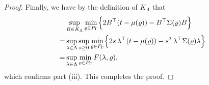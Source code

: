 \documentclass[12pt,leqno,titlepage]{amsart}
\newcommand{\1}{\mathbbm{1}}
\begin{document}
\begin{bibunit}
\begin{proof}
Finally, we have by the definition of $K_\Lambda$ that
\begin{align*}
&\sup_{B\in K_\Lambda}
\min_{\varrho\in P_\Gamma}
\Bigl\{
2B^\top(t-\mu(\varrho))
-
B^\top\Sigma(\varrho)B
\Bigr\}\\
=
&\sup_{\lambda\in\Lambda}
\sup_{s\ge0}
\min_{\varrho\in P_\Gamma}
\Bigl\{2s\,\lambda^\top(t-\mu(\varrho))
-
s^2\,\lambda^\top\Sigma(\varrho)\lambda\Bigr\} \\
=
&\sup_{\lambda\in\Lambda}
\min_{\varrho\in P_\Gamma}
F(\lambda,\varrho),
\end{align*}
which confirms part (iii). This completes the proof.
\end{proof}




































































































\end{bibunit}
\end{document}
